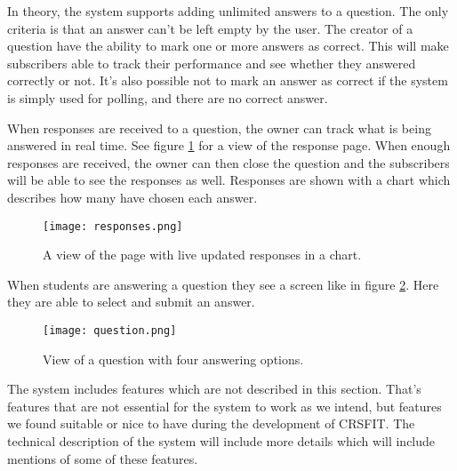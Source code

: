 In theory, the system supports adding unlimited answers to a question. The only criteria is that an answer can't be left empty by the user. The creator of a question have the ability to mark one or more answers as correct. This will make subscribers able to track their performance and see whether they answered correctly or not. It's also possible not to mark an answer as correct if the system is simply used for polling, and there are no correct answer.

When responses are received to a question, the owner can track what is being answered in real time. See figure \ref{fig:responses} for a view of the response page. When enough responses are received, the owner can then close the question and the subscribers will be able to see the responses as well. Responses are shown with a chart which describes how many have chosen each answer.

\begin{figure}[H]
\capstart
	\centering
		\texttt{[image: responses.png]}
	\caption[The response page]{A view of the page with live updated responses in a chart.}\label{fig:responses}
\end{figure}

When students are answering a question they see a screen like in figure \ref{fig:question}. Here they are able to select and submit an answer.

\begin{figure}[H]
\capstart
	\centering
		\texttt{[image: question.png]}
	\caption[A question page]{View of a question with four answering options.}\label{fig:question}
\end{figure}

The system includes features which are not described in this section. That's features that are not essential for the system to work as we intend, but features we found suitable or nice to have during the development of CRSFIT. The technical description of the system will include more details which will include mentions of some of these features.